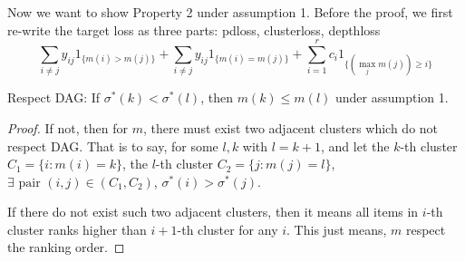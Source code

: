 Now we want to show Property 2 under assumption 1. 	 Before the proof, we first re-write the target loss as three parts: pdloss, clusterloss, depthloss$$\sum\limits_{i\not=j}y_{ij}1_{\{m(i)> m(j)\}}+\sum\limits_{i\not=j}y_{ij}1_{\{m(i)= m(j)\}}+\sum\limits_{i=1}^rc_i1_{\{(\max_jm(j))\geq i\}}$$

\begin{lemma}
  \label{lemma:3}
	Respect DAG: If $\sigma^*(k)<\sigma^*(l)$, then $m(k)\leq m(l)$ under assumption 1.
\end{lemma}
\begin{proof}

	
	
	
	If not, then for $m$, there must exist two adjacent clusters which do not respect DAG. That is to say, for some $l,k$ with $l=k+1$, and let the $k$-th cluster $C_1=\{i: m(i)=k\}$, the $l$-th cluster $C_2=\{j:m(j)=l\}$, $\exists \text{ pair } (i,j)\in (C_1, C_2)$, $\sigma^*(i)>\sigma^*(j)$. 
	
	If there do not exist such two adjacent clusters, then it means all items in $i$-th cluster ranks higher than $i+1$-th cluster for any $i$. This just means, $m$ respect the ranking order.
	
	
	

\end{proof}
